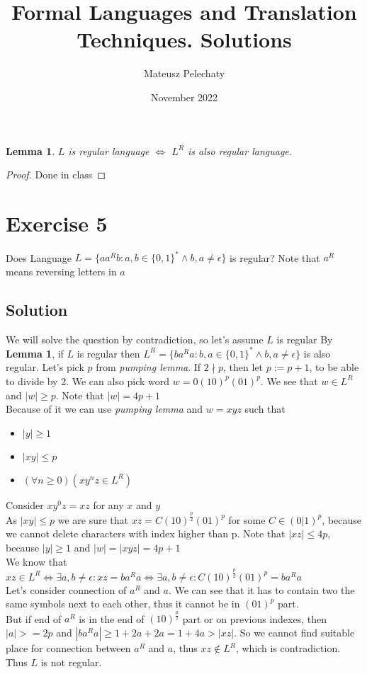 \documentclass{article}
\title{Formal Languages and Translation Techniques. Solutions}
\author{Mateusz Pelechaty}
\date{November 2022}
\newtheorem{theorem}{Lemma}
\begin{document}
\maketitle

\begin{theorem}
    $L$ is regular language $\iff$ $L^R$ is also regular language.    
\end{theorem}
\begin{proof}
    Done in class
\end{proof}

\section*{Exercise 5}
Does Language $ L = \{ aa^Rb : a, b \in \{0,1\}^* \land b,a \neq \epsilon \} $ is regular? 
Note that $a^R$ means reversing letters in $a$

\subsection*{Solution}
We will solve the question by contradiction, so let's assume $L$ is regular  \newline
By \textbf{Lemma 1}, if $L$ is regular then $L^R = \{ ba^Ra : b, a \in \{0,1\}^* \land b,a \neq \epsilon \}$ is also regular.  \newline
Let's pick $p$ from \textit{pumping lemma}. If $ 2 \nmid p $, then let $p := p+1$, to be able to divide by 2. We can also pick word $w = 0(10)^p(01)^p$. \newline
We see that $w \in L^R$ and $|w| \geq p$. Note that $|w| = 4p+1$\\
Because of it we can use \textit{pumping lemma} and $w = xyz$ such that 
\begin{itemize}
    \item $|y| \geq 1$
    \item $|xy| \leq p$
    \item $(\forall n \geq 0)(xy^nz \in L^R)$
\end{itemize}
Consider $xy^0z = xz$ for any $x$ and $y$\\
As  $|xy| \leq p$ we are sure that $xz = C(10)^{\frac{p}{2}}(01)^p$ for some $C \in (0|1)^p$, 
because we cannot delete characters with index higher than p. 
Note that $|xz| \leq 4p$, because $|y| \geq 1$ and $|w| = |xyz| = 4p+1$\\
We know that $xz \in L^R \iff \exists a,b \neq \epsilon: xz = ba^Ra \iff \exists a,b \neq \epsilon: C(10)^{\frac{p}{2}}(01)^p = ba^Ra$\\
Let's consider connection of $a^R$ and $a$. We can see that it has to contain two the same symbols next to each other, 
thus it cannot be in $(01)^p$ part. \\
But if end of $a^R$ is in the end of $(10)^{\frac{p}{2}}$ part or on previous indexes, then \\$|a| >= 2p$ and $|ba^Ra| \geq 1 + 2a + 2a = 1+4a > |xz| $.
So we cannot find suitable place for connection between $a^R$ and $a$, thus $xz \notin L^R$, which is contradiction.\\
Thus $L$ is not regular.
\end{document}
